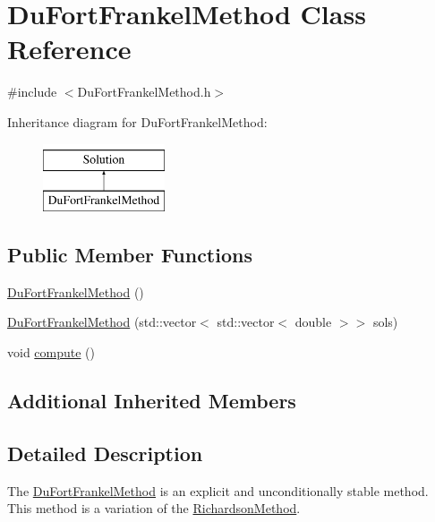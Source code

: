 \hypertarget{class_du_fort_frankel_method}{}\section{Du\+Fort\+Frankel\+Method Class Reference}
\label{class_du_fort_frankel_method}


{\ttfamily \#include $<$Du\+Fort\+Frankel\+Method.\+h$>$}

Inheritance diagram for Du\+Fort\+Frankel\+Method\+:\begin{figure}[H]
\begin{center}
\leavevmode
\includegraphics[height=2.000000cm]{class_du_fort_frankel_method}
\end{center}
\end{figure}
\subsection*{Public Member Functions}
\begin{DoxyCompactItemize}
\item 
\hyperlink{class_du_fort_frankel_method_ae4f8e7c2d498265fa8b8e6ea0bd74288}{Du\+Fort\+Frankel\+Method} ()
\item 
\hyperlink{class_du_fort_frankel_method_a5914f09f3f3aa00d0ac1d270e73613e2}{Du\+Fort\+Frankel\+Method} (std\+::vector$<$ std\+::vector$<$ double $>$$>$ sols)
\item 
void \hyperlink{class_du_fort_frankel_method_a68b9ad88883a71daba4c2fc92355b173}{compute} ()
\end{DoxyCompactItemize}
\subsection*{Additional Inherited Members}


\subsection{Detailed Description}
The \hyperlink{class_du_fort_frankel_method}{Du\+Fort\+Frankel\+Method} is an explicit and unconditionally stable method. ~\newline
 This method is a variation of the \hyperlink{class_richardson_method}{Richardson\+Method}. 

